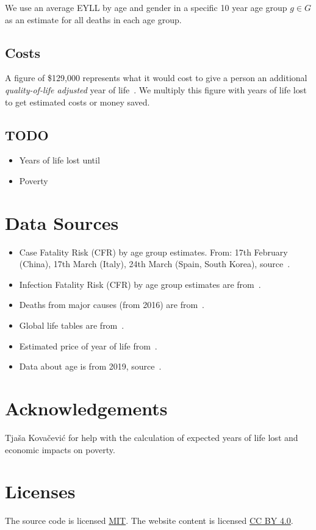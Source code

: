 \documentclass[12pt]{article}
\begin{document}
We use an average EYLL by age and gender in a specific 10 year age group $g \in G$ as an estimate
for all deaths in each age group.

\subsection*{Costs}
A figure of \$129,000 represents what it would cost to give a person an additional {\it quality-of-life adjusted} year of life~\cite{price}. We multiply this figure with years of life lost to get estimated costs or money saved.

\subsection*{TODO}
\begin{itemize}
\item Years of life lost until
\item Poverty
\end{itemize}
 

\section*{Data Sources}
\begin{itemize}
\item Case Fatality Risk (CFR) by age group estimates. From: 17th February (China), 17th March (Italy), 24th March (Spain, South Korea), source~\cite{cfrs}.
\item Infection Fatality Risk (CFR) by age group estimates are from~\cite{imperial}.
\item Deaths from major causes (from 2016) are from~\cite{major}.
\item Global life tables are from~\cite{expectancies}.
\item Estimated price of year of life from~\cite{price}.
\item Data about age is from 2019, source~\cite{pyramids}.
\end{itemize}

\section*{Acknowledgements}
Tjaša Kovačević for help with the calculation of expected years of life lost and economic impacts on poverty.

\section*{Licenses}
The source code is licensed \href{http://opensource.org/licenses/mit-license.php}{MIT}. The website content is licensed \href{https://creativecommons.org/licenses/by/4.0/deed.ast}{CC BY 4.0}.
\end{document}

